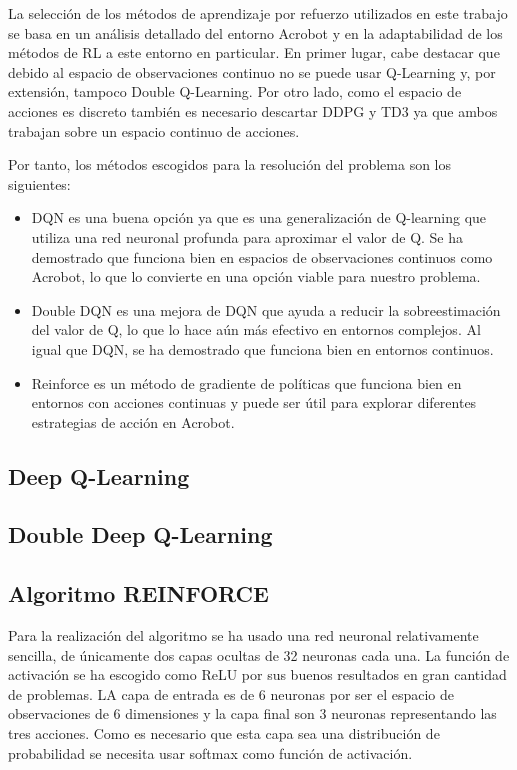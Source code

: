 \documentclass[12pt]{article}
\begin{document}
	La selección de los métodos de aprendizaje por refuerzo utilizados en este trabajo se basa en un análisis detallado del entorno Acrobot y en la adaptabilidad de los métodos de RL a este entorno en particular. En primer lugar, cabe destacar que debido al espacio de observaciones continuo no se puede usar Q-Learning y, por extensión, tampoco Double Q-Learning. Por otro lado, como el espacio de acciones es discreto también es necesario descartar DDPG y TD3 ya que ambos trabajan sobre un espacio continuo de acciones.
	
	Por tanto, los métodos escogidos para la resolución del problema son los siguientes:
	\begin{itemize}
		\item DQN es una buena opción ya que es una generalización de Q-learning que utiliza una red neuronal profunda para aproximar el valor de Q. Se ha demostrado que funciona bien en espacios de observaciones continuos como Acrobot, lo que lo convierte en una opción viable para nuestro problema.
		\item Double DQN es una mejora de DQN que ayuda a reducir la sobreestimación del valor de Q, lo que lo hace aún más efectivo en entornos complejos. Al igual que DQN, se ha demostrado que funciona bien en entornos continuos.
		\item  Reinforce es un método de gradiente de políticas que funciona bien en entornos con acciones continuas y puede ser útil para explorar diferentes estrategias de acción en Acrobot.
		
	\end{itemize}

	\subsection{Deep Q-Learning}
	
	\subsection{Double Deep Q-Learning}
	
	\subsection{Algoritmo REINFORCE}
	
		Para la realización del algoritmo se ha usado una red neuronal relativamente sencilla, de únicamente dos capas ocultas de 32 neuronas cada una. La función de activación se ha escogido como ReLU por sus buenos resultados en gran cantidad de problemas. LA capa de entrada es de 6 neuronas por ser el espacio de observaciones de 6 dimensiones y la capa final son 3 neuronas representando las tres acciones. Como es necesario que esta capa sea una distribución de probabilidad se necesita usar softmax como función de activación.
		
\end{document}
